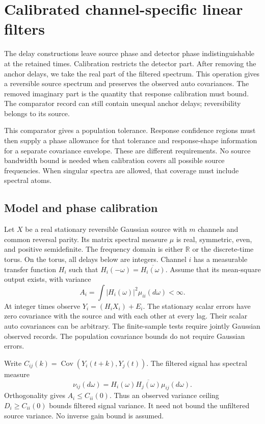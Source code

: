 \section{Calibrated channel-specific linear filters}\label{sec:filterextension}

The delay constructions leave source phase and detector phase indistinguishable at the retained times. Calibration restricts the detector part. After removing the anchor delays, we take the real part of the filtered spectrum. This operation gives a reversible source spectrum and preserves the observed auto covariances. The removed imaginary part is the quantity that response calibration must bound. The comparator record can still contain unequal anchor delays; reversibility belongs to its source.

This comparator gives a population tolerance. Response confidence regions must then supply a phase allowance for that tolerance and response-shape information for a separate covariance envelope. These are different requirements. No source bandwidth bound is needed when calibration covers all possible source frequencies. When singular spectra are allowed, that coverage must include spectral atoms.

\subsection{Model and phase calibration}

Let $X$ be a real stationary reversible Gaussian source with $m$ channels
and common reversal parity. Its matrix spectral measure $\mu$ is real,
symmetric, even, and positive semidefinite. The frequency domain is either
$\mathbb R$ or the discrete-time torus. On the torus, all delays below are
integers. Channel $i$ has a measurable transfer function $H_i$ such that
$H_i(-\omega)=\overline{H_i(\omega)}$. Assume that its mean-square output
exists, with variance
\[
 A_i=\int |H_i(\omega)|^2\mu_{ii}(d\omega)<\infty.
\]
At integer times observe $Y_i=(H_iX_i)+E_i$. The stationary scalar errors
have zero covariance with the source and with each other at every lag.
Their scalar auto covariances can be arbitrary. The finite-sample tests require jointly Gaussian observed records. The population covariance
bounds do not require Gaussian errors.

Write $C_{ij}(k)=\operatorname{Cov}(Y_i(t+k),Y_j(t))$. The filtered signal
has spectral measure
\[
 \nu_{ij}(d\omega)=H_i(\omega)\overline{H_j(\omega)}\mu_{ij}(d\omega).
\]
Orthogonality gives $A_i\le C_{ii}(0)$. Thus an observed variance ceiling
$D_i\ge C_{ii}(0)$ bounds filtered signal variance. It need not bound the
unfiltered source variance. No inverse gain bound is assumed.

